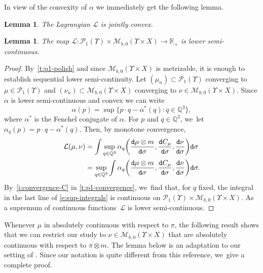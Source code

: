 \documentclass[10pt]{amsart}
\newcommand{\real}{\mathbb{R}}
\newtheorem{lemma}[theorem]{Lemma}
\theoremstyle{definition}
\theoremstyle{remark}
\DeclarePairedDelimiter{\paren}{\lparen}{\rparen}
\begin{document}
In view of the convexity of $\alpha$ we immediately get the following lemma.
\begin{lemma}\label{t:convex-lagrangian}
The Lagrangian $\mathcal{L}$ is jointly convex.
\end{lemma}

\begin{lemma}\label{t:lsc-lagrangian}
The map $\mathcal{L} \colon \mathscr{P}_{1}(\varUpsilon) \times \mathscr{M}_{b,0}(\varUpsilon \times X) \to \real_{+}$ is lower semi-continuous.
\end{lemma}
\begin{proof}
By~\cref{t:p1-polish} and since $\mathscr{M}_{b,0}(\varUpsilon \times X)$ is metrizable, it is enough to establish sequential lower semi-continuity.
Let $(\mu_{n}) \subset \mathscr{P}_{1}(\varUpsilon)$ converging to $\mu \in \mathscr{P}_{1}(\varUpsilon)$ and $(\nu_{n}) \subset \mathscr{M}_{b,0}(\varUpsilon \times X)$ converging to $\nu \in \mathscr{M}_{b,0}(\varUpsilon \times X)$.
Since $\alpha$ is lower semi-continuous and convex we can write
\begin{equation*}
\alpha(p) = \sup \bigl\{ p \cdot q - \alpha^{*}(q) : q \in \mathbb{Q}^{3} \bigr\},
\end{equation*}
where $\alpha^{*}$ is the Fenchel conjugate of $\alpha$.
For $p$ and $q \in \mathbb{Q}^{3}$, we~let $\alpha_{q}(p) = p \cdot q - \alpha^{*}(q)$.
Then, by monotone convergence,
\begin{equation}
\begin{aligned}\label{e:sup-integrals}
\mathcal{L}(\mu, \nu) &= \int \sup_{q \in \mathbb{Q}^{3}} \alpha_{q}\paren*{\frac{\mathtt{d} \mu \otimes m}{\mathtt{d} \sigma}, \frac{\mathtt{d} C_{\mu}}{\mathtt{d} \sigma}, \frac{\mathtt{d} \nu}{\mathtt{d} \sigma}} \mathtt{d} \sigma \\
&= \sup_{q \in \mathbb{Q}^{3}} \int \alpha_{q}\paren*{\frac{\mathtt{d} \mu \otimes m}{\mathtt{d} \sigma}, \frac{\mathtt{d} C_{\mu}}{\mathtt{d} \sigma}, \frac{\mathtt{d} \nu}{\mathtt{d} \sigma}} \mathtt{d} \sigma.
\end{aligned}
\end{equation}
By~\cref{i:convergence-C} in \cref{t:p1-convergence}, we~find that, for $q$ fixed, the integral in the last line of \cref{e:sup-integrals} is continuous on $\mathscr{P}_{1}(\varUpsilon) \times \mathscr{M}_{b,0}(\varUpsilon \times X)$.
As a supremum of continuous functions~$\mathcal{L}$ is lower semi-continuous.
\end{proof}

Whenever $\mu$ in absolutely continuous with respect to $\pi$, the following result shows that we can restrict our study to $\nu \in \mathscr{M}_{b,0}(\varUpsilon \times X)$ that are absolutely continuous with respect to $\pi \otimes m$.
The lemma below is an adaptation to our setting of \cite[Lem.\,2.3]{Erbar}. Since our notation is quite different from this reference, we~give a complete proof.
\end{document}
